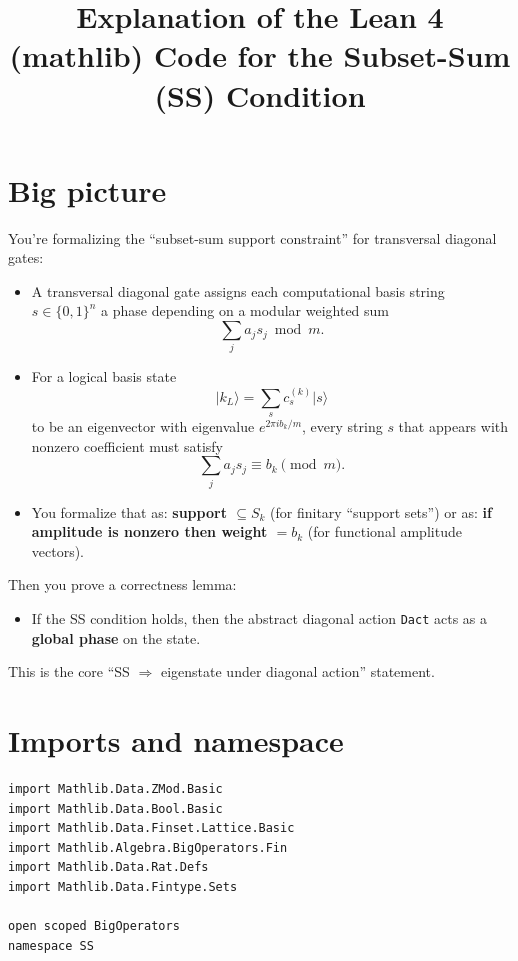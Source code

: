 \documentclass[11pt]{article}
\title{Explanation of the Lean 4 (mathlib) Code for the Subset-Sum (SS) Condition}
\author{}
\date{}
\newcommand{\ket}[1]{\lvert #1 \rangle}
\begin{document}
\maketitle

\section*{Big picture}

You're formalizing the ``subset-sum support constraint'' for transversal diagonal gates:

\begin{itemize}
\item A transversal diagonal gate assigns each computational basis string $s\in\{0,1\}^n$ a phase depending on a modular weighted sum
\[
\sum_j a_j s_j \bmod m.
\]
\item For a logical basis state
\[
\ket{k_L}=\sum_s c^{(k)}_s \ket{s}
\]
to be an eigenvector with eigenvalue $e^{2\pi i b_k/m}$, every string $s$ that appears with nonzero coefficient must satisfy
\[
\sum_j a_j s_j \equiv b_k \pmod m.
\]
\item You formalize that as: \textbf{support $\subseteq S_k$} (for finitary ``support sets'') or as: \textbf{if amplitude is nonzero then weight $=b_k$} (for functional amplitude vectors).
\end{itemize}

Then you prove a correctness lemma:

\begin{itemize}
\item If the SS condition holds, then the abstract diagonal action \texttt{Dact} acts as a \textbf{global phase} on the state.
\end{itemize}

This is the core ``SS $\Rightarrow$ eigenstate under diagonal action'' statement.

\section*{Imports and namespace}

\begin{lstlisting}
import Mathlib.Data.ZMod.Basic
import Mathlib.Data.Bool.Basic
import Mathlib.Data.Finset.Lattice.Basic
import Mathlib.Algebra.BigOperators.Fin
import Mathlib.Data.Rat.Defs
import Mathlib.Data.Fintype.Sets

open scoped BigOperators
namespace SS
\end{lstlisting}
\end{document}
